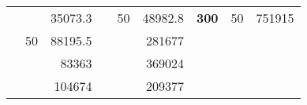 \begin{table}[H]
\begin{tabular}{|ccrccrccc}
\rowcolor[HTML]{DDFDFF} 
\multicolumn{1}{|c|}{\cellcolor[HTML]{FFFFC7}}                                & \multicolumn{1}{c|}{\cellcolor[HTML]{DDFDFF}}                      & \multicolumn{1}{r|}{\cellcolor[HTML]{DAE8FC}35073.3}   & \multicolumn{1}{c|}{\cellcolor[HTML]{FFFFC7}}                                & \multicolumn{1}{c|}{\multirow{-10}{*}{\cellcolor[HTML]{DDFDFF}50}}  & \multicolumn{1}{r|}{\cellcolor[HTML]{DDFDFF}48982.8}   & \multicolumn{1}{c|}{\multirow{-19}{*}{\cellcolor[HTML]{FFFFC7}\textbf{300}}} & \multicolumn{1}{c|}{\multirow{-10}{*}{\cellcolor[HTML]{DDFDFF}50}} & \multicolumn{1}{r|}{\cellcolor[HTML]{DDFDFF}751915}    \\ \cline{3-3} \cline{5-9} 
\multicolumn{1}{|c|}{\cellcolor[HTML]{FFFFC7}}                                & \multicolumn{1}{c|}{\multirow{-10}{*}{\cellcolor[HTML]{DDFDFF}50}} & \multicolumn{1}{r|}{\cellcolor[HTML]{DDFDFF}88195.5}   & \multicolumn{1}{c|}{\cellcolor[HTML]{FFFFC7}}                                & \multicolumn{1}{c|}{\cellcolor[HTML]{DAE8FC}}                       & \multicolumn{1}{r|}{\cellcolor[HTML]{DAE8FC}281677}    &                                                                              &                                                                    &                                                        \\ \cline{2-3} \cline{6-6}
\multicolumn{1}{|c|}{\cellcolor[HTML]{FFFFC7}}                                & \multicolumn{1}{c|}{\cellcolor[HTML]{DAE8FC}}                      & \multicolumn{1}{r|}{\cellcolor[HTML]{DAE8FC}83363}     & \multicolumn{1}{c|}{\cellcolor[HTML]{FFFFC7}}                                & \multicolumn{1}{c|}{\cellcolor[HTML]{DAE8FC}}                       & \multicolumn{1}{r|}{\cellcolor[HTML]{DDFDFF}369024}    &                                                                              &                                                                    &                                                        \\ \cline{3-3} \cline{6-6}
\multicolumn{1}{|c|}{\cellcolor[HTML]{FFFFC7}}                                & \multicolumn{1}{c|}{\cellcolor[HTML]{DAE8FC}}                      & \multicolumn{1}{r|}{\cellcolor[HTML]{DDFDFF}104674}    & \multicolumn{1}{c|}{\cellcolor[HTML]{FFFFC7}}                                & \multicolumn{1}{c|}{\cellcolor[HTML]{DAE8FC}}                       & \multicolumn{1}{r|}{\cellcolor[HTML]{DAE8FC}209377}    &                                                                              &                                                                    &                                                        \\ \cline{3-3} \cline{6-6}

\end{tabular}
\end{table}
